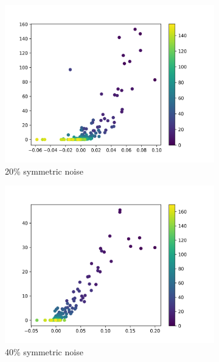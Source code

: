 \documentclass{article}
\begin{document}
\begin{figure}[h]
\begin{subfigure}[b]{0.22\textwidth}
        \includegraphics[width=\textwidth]{figs/Dense100_20_scatter_2.png}
        \vspace{-.5cm}
        \caption{20\% symmetric noise}
    \end{subfigure}
    \begin{subfigure}[b]{0.22\textwidth}
        \includegraphics[width=\textwidth]{figs/Dense100_40_scatter.png}
        \vspace{-.5cm}
        \caption{40\% symmetric noise}
    \end{subfigure}
    \begin{subfigure}[b]{0.22\textwidth}

\end{subfigure}
\end{figure}
\end{document}
